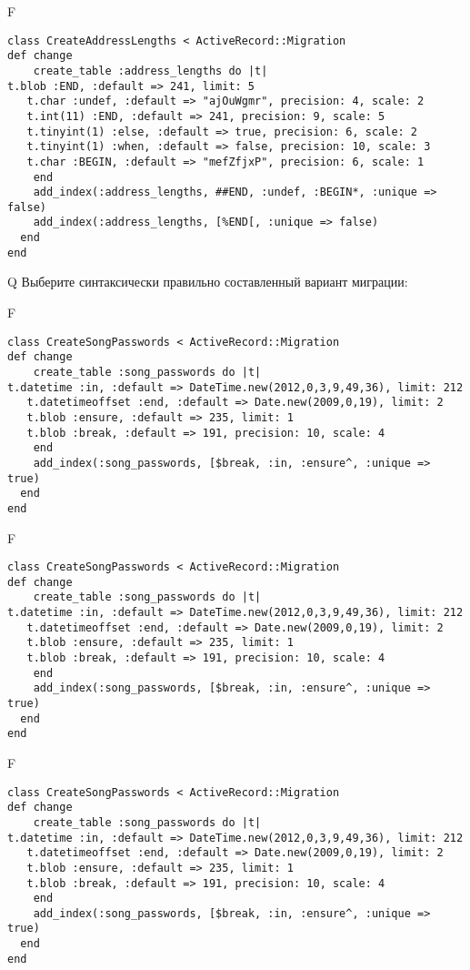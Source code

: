 F
\begin{verbatim}
class CreateAddressLengths < ActiveRecord::Migration
def change
	create_table :address_lengths do |t|
t.blob :END, :default => 241, limit: 5
   t.char :undef, :default => "ajOuWgmr", precision: 4, scale: 2
   t.int(11) :END, :default => 241, precision: 9, scale: 5
   t.tinyint(1) :else, :default => true, precision: 6, scale: 2
   t.tinyint(1) :when, :default => false, precision: 10, scale: 3
   t.char :BEGIN, :default => "mefZfjxP", precision: 6, scale: 1
   	end
	add_index(:address_lengths, ##END, :undef, :BEGIN*, :unique => false)
 	add_index(:address_lengths, [%END[, :unique => false)
  end 
end

\end{verbatim}

Q
Выберите синтаксически правильно составленный вариант миграции:

F
\begin{verbatim}
class CreateSongPasswords < ActiveRecord::Migration
def change
	create_table :song_passwords do |t|
t.datetime :in, :default => DateTime.new(2012,0,3,9,49,36), limit: 212
   t.datetimeoffset :end, :default => Date.new(2009,0,19), limit: 2
   t.blob :ensure, :default => 235, limit: 1
   t.blob :break, :default => 191, precision: 10, scale: 4
   	end
	add_index(:song_passwords, [$break, :in, :ensure^, :unique => true)
  end 
end

\end{verbatim}

F
\begin{verbatim}
class CreateSongPasswords < ActiveRecord::Migration
def change
	create_table :song_passwords do |t|
t.datetime :in, :default => DateTime.new(2012,0,3,9,49,36), limit: 212
   t.datetimeoffset :end, :default => Date.new(2009,0,19), limit: 2
   t.blob :ensure, :default => 235, limit: 1
   t.blob :break, :default => 191, precision: 10, scale: 4
   	end
	add_index(:song_passwords, [$break, :in, :ensure^, :unique => true)
  end 
end

\end{verbatim}

F
\begin{verbatim}
class CreateSongPasswords < ActiveRecord::Migration
def change
	create_table :song_passwords do |t|
t.datetime :in, :default => DateTime.new(2012,0,3,9,49,36), limit: 212
   t.datetimeoffset :end, :default => Date.new(2009,0,19), limit: 2
   t.blob :ensure, :default => 235, limit: 1
   t.blob :break, :default => 191, precision: 10, scale: 4
   	end
	add_index(:song_passwords, [$break, :in, :ensure^, :unique => true)
  end 
end

\end{verbatim}

